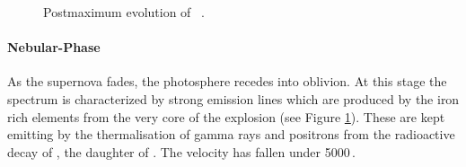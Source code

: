 \begin{figure}[htbp] %
   \centering
   \caption{Postmaximum evolution of \ \citep[Figures kindly provided by M. Tanaka;][]{2011MNRAS.410.1725T}.}
   \label{fig:sn2003du_postmax}
\end{figure}




\paragraph{Nebular-Phase}
As the supernova fades, the photosphere recedes into oblivion. At this stage the spectrum is characterized by strong emission lines which are produced by the iron rich elements from the very core of the explosion (see Figure \ref{fig:sn2003du_postmax}). These are kept emitting by the thermalisation of gamma rays and positrons from the radioactive decay of \Co, the daughter of \Ni. The velocity has fallen under 5000\,\kms. 




